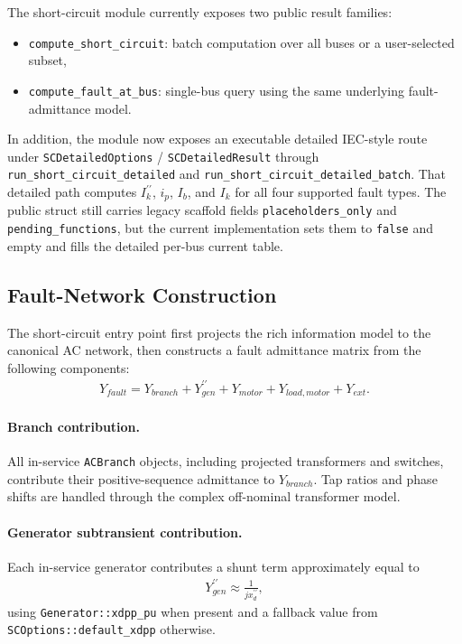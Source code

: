 The short-circuit module currently exposes two public result families:
\begin{itemize}
  \item \texttt{compute\_short\_circuit}: batch computation over all buses or a user-selected subset,
  \item \texttt{compute\_fault\_at\_bus}: single-bus query using the same underlying fault-admittance model.
\end{itemize}

In addition, the module now exposes an executable detailed IEC-style route under
\texttt{SCDetailedOptions} / \texttt{SCDetailedResult} through
\texttt{run\_short\_circuit\_detailed} and
\texttt{run\_short\_circuit\_detailed\_batch}.  That detailed path computes
\(I_{k}^{\prime\prime}\), \(i_p\), \(I_b\), and \(I_k\) for all four supported
fault types.  The public struct still carries legacy scaffold fields
\texttt{placeholders\_only} and \texttt{pending\_functions}, but the current
implementation sets them to \texttt{false} and empty and fills the detailed
per-bus current table.

\subsection{Fault-Network Construction}

The short-circuit entry point first projects the rich information model to the
canonical AC network, then constructs a fault admittance matrix from the
following components:
\begin{align}
Y_{fault} = Y_{branch} + Y_{gen}^{\prime\prime} + Y_{motor} + Y_{load,motor} + Y_{ext}.
\end{align}

\paragraph{Branch contribution.}
All in-service \texttt{ACBranch} objects, including projected transformers and
switches, contribute their positive-sequence admittance to \(Y_{branch}\).  Tap
ratios and phase shifts are handled through the complex off-nominal transformer
model.

\paragraph{Generator subtransient contribution.}
Each in-service generator contributes a shunt term approximately equal to
\begin{align}
Y_{gen}^{\prime\prime} \approx \frac{1}{j x_d^{\prime\prime}},
\end{align}
using \texttt{Generator::xdpp\_pu} when present and a fallback value from
\texttt{SCOptions::default\_xdpp} otherwise.


